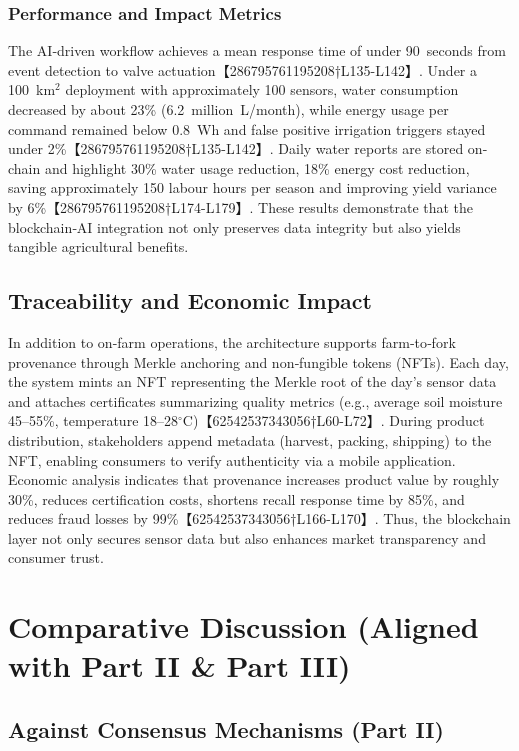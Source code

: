 \subsubsection{Performance and Impact Metrics}
The AI‑driven workflow achieves a mean response time of under 90~seconds from event detection to valve actuation【286795761195208†L135-L142】.  Under a 100~km$^2$ deployment with approximately 100 sensors, water consumption decreased by about 23\% (6.2~million~L/month), while energy usage per command remained below 0.8~Wh and false positive irrigation triggers stayed under 2\%【286795761195208†L135-L142】.  Daily water reports are stored on-chain and highlight 30\% water usage reduction, 18\% energy cost reduction, saving approximately 150 labour hours per season and improving yield variance by 6\%【286795761195208†L174-L179】.  These results demonstrate that the blockchain‑AI integration not only preserves data integrity but also yields tangible agricultural benefits.

\subsection{Traceability and Economic Impact}
In addition to on-farm operations, the architecture supports farm‑to‑fork provenance through Merkle anchoring and non‑fungible tokens (NFTs).  Each day, the system mints an NFT representing the Merkle root of the day's sensor data and attaches certificates summarizing quality metrics (e.g., average soil moisture 45--55\%, temperature 18--28$^\circ$C)【62542537343056†L60-L72】.  During product distribution, stakeholders append metadata (harvest, packing, shipping) to the NFT, enabling consumers to verify authenticity via a mobile application.  Economic analysis indicates that provenance increases product value by roughly 30\%, reduces certification costs, shortens recall response time by 85\%, and reduces fraud losses by 99\%【62542537343056†L166-L170】.  Thus, the blockchain layer not only secures sensor data but also enhances market transparency and consumer trust.

\section{Comparative Discussion (Aligned with Part II \& Part III)}

\subsection{Against Consensus Mechanisms (Part II)}
